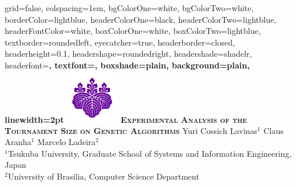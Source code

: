 \documentclass[portrait,final,a0paper,fontscale=0.277]{baposter}
\begin{document}
	\begin{poster}%
		{
			grid=false,
			colspacing=1em,
			bgColorOne=white,
			bgColorTwo=white,
			borderColor=lightblue,
			headerColorOne=black,
			headerColorTwo=lightblue,
			headerFontColor=white,
			boxColorOne=white,
			boxColorTwo=lightblue,
			textborder=roundedleft,
			eyecatcher=true,
			headerborder=closed,
			headerheight=0.1\textheight,
			headershape=roundedright,
			headershade=shadelr,
			headerfont=\Large\bf\textsc, %
			textfont={\setlength{\parindent}{1.5em}},
			boxshade=plain,
			background=plain,
			linewidth=2pt
		}
		{\includegraphics[height=6.25em]{University_of_Tsukuba_logo.png}} 
		{\bf\textsc{Experimental Analysis of the Tournament Size on Genetic Algorithms}\normalsize}
		{ \normalsize Yuri Cossich Lavinas$^1$ Claus Aranha$^1$  Marcelo Ladeira$^2$\\ $^1$Tsukuba University, Graduate School of Systems and Information Engineering, Japan\\ $^2$University of Brasilia, Computer Science Department}
		
		
		\newcommand{\colouredcircle}{%
			\tikz{\useasboundingbox (-0.2em,-0.32em) rectangle(0.2em,0.32em); \draw[draw=black,fill=lightblue,line width=0.03em] (0,0) circle(0.18em);}}
		

\end{poster}
\end{document}
